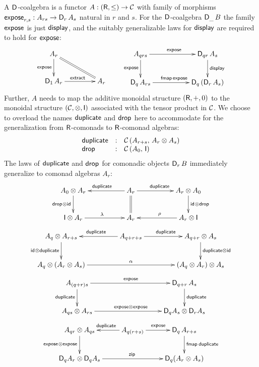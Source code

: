 \documentclass[acmsmall,review,anonymous]{acmart}\settopmatter{printfolios=true,printccs=false,printacmref=false}
\begin{document}
A $\D$-coalgebra is a functor $A : (\R,\leq) \to \CC$ with family of
morphisms $\expose[r,s] : A_{rs} \to \D[r]\,A_s$ natural in $r$ and
$s$.  For the $\D$-coalgebra $\D[\_]\,B$ the family $\expose$ is just
$\tdisplay$, and the suitably generalizable laws for $\tdisplay$ are
required to hold for $\texpose$:
\[
\xymatrix@C=10ex{
A_r  \ar[d]_{\texpose} \ar@{=}[dr]
\\
\D[1]\,A_r \ar[r]^{\textract}
  & A_r
}
\qquad
\xymatrix@C=12ex{
A_{qrs} \ar[d]_{\texpose} \ar[r]^{\texpose}
  & \D[qr]\,A_s \ar[d]^{\tdisplay}
\\
\D[q]\,A_{rs} \ar[r]^{\tfmap\,\texpose}
  & \D[q]\,(\D[r]\,A_s)
}
\]
Further, $A$ needs to map the additive monoidal structure $(\R,+,0)$
to the monoidal structure $(\CC,\otimes,\I)$ associated with the
tensor product in $\CC$.  We choose to overload the names
$\tduplicate$ and $\tdrop$ here to accommodate for the generalization
from $\R$-comonads to $\R$-comonad algebras:
\[
\begin{array}{lcl}
  \tduplicate & : & \Hom {A_{r+s}} {A_r \otimes A_s} \\
  \tdrop      & : & \Hom {A_0} {\I} \\
\end{array}
\]
The laws of $\tduplicate$ and $\tdrop$ for comonadic objects
$\D[r]\,B$ immediately generalize to comonad algebras $A_r$:
\[
\xymatrix@C=12ex{
A_{0} \otimes A_r \ar[d]_{\tdrop \otimes \tid}
& A_r \ar[l]_{\tduplicate} \ar[r]^{\tduplicate} \ar@{=}[d]
& A_r \otimes A_{0} \ar[d]^{\tid \otimes \tdrop}
\\
\I \otimes A_r \ar[r]^{\Gl}
& A_r
& A_r \otimes \I \ar[l]_{\Gr}
}
\]
\[
\xymatrix@C=10ex{
A_q \otimes A_{r+s}  \ar[d]_{\tid \otimes \tduplicate}
& A_{q+r+s} \ar[l]_{\tduplicate} \ar[r]^{\tduplicate}
& A_{q+r} \otimes A_s \ar[d]^{\tduplicate \otimes \tid}
\\
A_q \otimes (A_r \otimes A_s) \ar[rr]^{\Ga}
& & (A_q \otimes A_r) \otimes A_s
}
\]
\[
\xymatrix@C=22ex{
A_{(q+r)s} \ar[r]^{\texpose} \ar[d]_{\tduplicate}
& \D[q+r]\,A_s \ar[d]^{\tduplicate}
\\
A_{qs} \otimes A_{rs} \ar[r]^{\texpose \otimes \texpose}
& \D[q]A_s \otimes \D[r]A_s
}
\]
\[
\xymatrix{
A_{qr} \otimes A_{qs} \ar[d]_{\expose \otimes \expose}
  & A_{q(r+s)} \ar[l]_{\tduplicate} \ar[r]^{\expose}
  & \D[q]\,A_{r+s} \ar[d]^{\fmap\tduplicate}
\\
\D[q]A_r \otimes \D[q]A_s \ar[rr]^{\tzip}
&&
\D[q](A_r \otimes A_s)
}
\]
\end{document}
